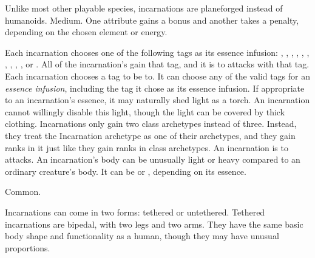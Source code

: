    Unlike most other playable species, incarnations are planeforged instead of humanoids.
   Medium.
   One attribute gains a  bonus and another takes a  penalty, depending on the chosen element or energy.
  \begin{raggeditemize}
     Each incarnation chooses one of the following tags as its essence infusion: \atAcid, \atAir, \atAuditory, \atCold, \atCompulsion, \atEarth, \atEmotion, \atElectricity, \atFire, \atVisual, or \atWater.
      All of the incarnation's  gain that tag, and it is \impervious to attacks with that tag.
     Each incarnation chooses a tag to be \vulnerable to.
      It can choose any of the valid tags for an \textit{essence infusion}, including the tag it chose as its essence infusion.
     If appropriate to an incarnation's essence, it may naturally shed light as a torch.
      An incarnation cannot willingly disable this light, though the light can be covered by thick clothing.
     Incarnations only gain two class archetypes instead of three.
      Instead, they treat the Incarnation archetype as one of their archetypes, and they gain ranks in it just like they gain ranks in class archetypes.
     An incarnation is \impervious to \atPoison attacks.
     An incarnation's body can be unusually light or heavy compared to an ordinary creature's body.
      It can be  or , depending on its essence.
  \end{raggeditemize}
   Common.

  Incarnations can come in two forms: tethered or untethered.
  Tethered incarnations are bipedal, with two legs and two arms.
  They have the same basic body shape and functionality as a human, though they may have unusual proportions.

